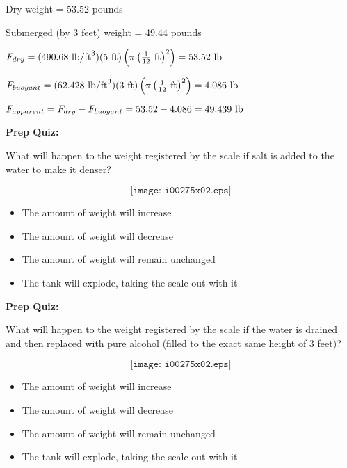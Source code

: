 
Dry weight = 53.52 pounds

\vskip 10pt

Submerged (by 3 feet) weight = 49.44 pounds







$F_{dry} = (490.68 \hbox{ lb/ft}^3) (5 \hbox{ ft}) \left( \pi \left( {1 \over 12} \hbox{ ft} \right)^2 \right) = 53.52 \hbox{ lb}$

\vskip 10pt

$F_{buoyant} = (62.428 \hbox{ lb/ft}^3) (3 \hbox{ ft}) \left( \pi \left( {1 \over 12} \hbox{ ft} \right)^2 \right) = 4.086 \hbox{ lb}$

\vskip 10pt

$F_{apparent} = F_{dry} - F_{buoyant} = 53.52 - 4.086 = 49.439 \hbox{ lb}$




\vfil \eject

\noindent
{\bf Prep Quiz:}

What will happen to the weight registered by the scale if salt is added to the water to make it denser?

$$\texttt{[image: i00275x02.eps]}$$

\begin{itemize}
\item{} The amount of weight will increase
\vskip 5pt 
\item{} The amount of weight will decrease
\vskip 5pt 
\item{} The amount of weight will remain unchanged
\vskip 5pt 
\item{} The tank will explode, taking the scale out with it
\end{itemize}





\vfil \eject

\noindent
{\bf Prep Quiz:}

What will happen to the weight registered by the scale if the water is drained and then replaced with pure alcohol (filled to the exact same height of 3 feet)?

$$\texttt{[image: i00275x02.eps]}$$

\begin{itemize}
\item{} The amount of weight will increase
\vskip 5pt 
\item{} The amount of weight will decrease
\vskip 5pt 
\item{} The amount of weight will remain unchanged
\vskip 5pt 
\item{} The tank will explode, taking the scale out with it
\end{itemize}





